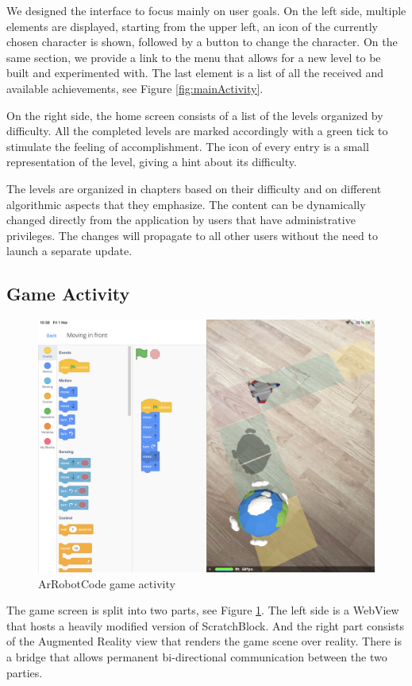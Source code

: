 \documentclass[12 pct]{report}
\begin{document}
We designed the interface to focus mainly on user goals.
On the left side, multiple elements are displayed, starting from the upper left, an icon of the currently chosen character is shown, followed by a button to change the character.
On the same section, we provide a link to the menu that allows for a new level to be built and experimented with. 
The last element is a list of all the received and available achievements, see Figure \ref{fig:mainActivity}.

On the right side, the home screen consists of a list of the levels organized by difficulty. 
All the completed levels are marked accordingly with a green tick to stimulate the feeling of accomplishment. 
The icon of every entry is a small representation of the level, giving a hint about its difficulty. 

The levels are organized in chapters based on their difficulty and on different algorithmic aspects that they emphasize. 
The content can be dynamically changed directly from the application by users that have administrative privileges. 
The changes will propagate to all other users without the need to launch a separate update.

\subsection*{Game Activity}
\begin{figure}[H]
\includegraphics[width=1.0\textwidth]{ArRobotCode2}
\centering
\caption{ArRobotCode game activity}
\label{fig:gameScreen}
\end{figure}
The game screen is split into two parts, see Figure \ref{fig:gameScreen}. 
The left side is a WebView \cite{hazarika2014recommendations} that hosts a heavily modified version of ScratchBlock. 
And the right part consists of the Augmented Reality view that renders the game scene over reality. 
There is a bridge that allows permanent bi-directional communication between the two parties.
\end{document}
